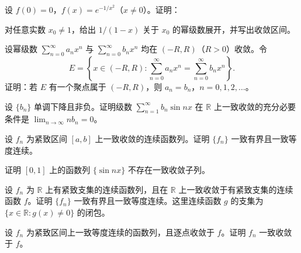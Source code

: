 \noindent\begin{minipage}{\textwidth}
设 $f(0)=0$，$f(x)=e^{-1/x^2}$（$x\ne0$）。证明：
\end{minipage}\par\vfill
\noindent\begin{minipage}{\textwidth}
对任意实数 $x_0\ne1$，给出 $1/(1-x)$ 关于 $x_0$ 的幂级数展开，并写出收敛区间。
\end{minipage}\par\vfill
\noindent\begin{minipage}{\textwidth}
设幂级数 $\sum_{n=0}^{\infty}a_nx^n$ 与 $\sum_{n=0}^{\infty}b_nx^n$ 均在 $(-R,R)$（$R>0$）收敛。令\[E=\left\{x\in(-R,R):\sum_{n=0}^{\infty}a_nx^n=\sum_{n=0}^{\infty}b_nx^n\right\}.\]证明：若 $E$ 有一个聚点属于 $(-R,R)$，则 $a_n=b_n$，$n=0,1,2,\ldots$。
\end{minipage}\par\vfill
\newpage
\noindent\begin{minipage}{\textwidth}
设 $\{b_n\}$ 单调下降且非负。证明级数 $\sum_{n=1}^{\infty}b_n\sin nx$ 在 $\mathbb R$ 上一致收敛的充分必要条件是 $\lim_{n\to\infty}nb_n=0$。
\end{minipage}\par\vfill
\noindent\begin{minipage}{\textwidth}
设 $f_n$ 为紧致区间 $[a,b]$ 上一致收敛的连续函数列。证明 $\{f_n\}$ 一致有界且一致等度连续。
\end{minipage}\par\vfill
\noindent\begin{minipage}{\textwidth}
证明 $[0,1]$ 上的函数列 $\{\sin nx\}$ 不存在一致收敛子列。
\end{minipage}\par\vfill
\noindent\begin{minipage}{\textwidth}
设 $f_n$ 为 $\mathbb R$ 上有紧致支集的连续函数列，且在 $\mathbb R$ 上一致收敛于有紧致支集的连续函数 $f$。证明 $\{f_n\}$ 一致有界且一致等度连续。这里连续函数 $g$ 的支集为 $\{x\in\mathbb R:g(x)\ne0\}$ 的闭包。
\end{minipage}\par\vfill
\newpage
\noindent\begin{minipage}{\textwidth}
设 $f_n$ 为紧致区间上一致等度连续的函数列，且逐点收敛于 $f$。证明 $f_n$ 一致收敛于 $f$。
\end{minipage}\par\vfill
